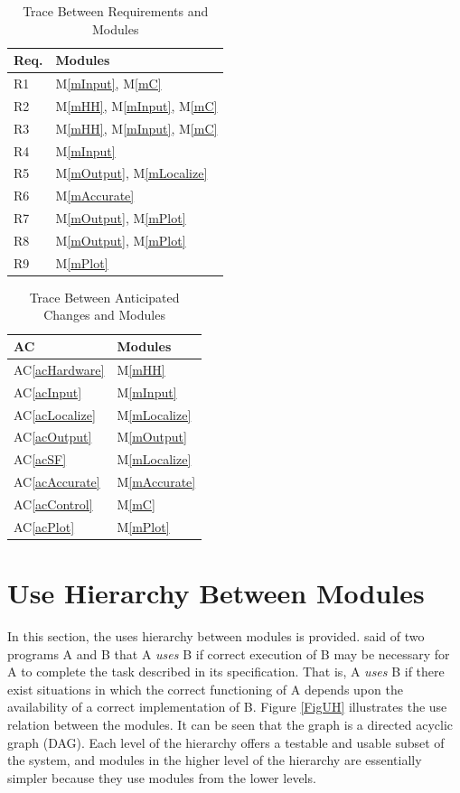 \documentclass[12pt, titlepage]{article}
\newcommand{\acref}[1]{AC\ref{#1}}
\newcommand{\mref}[1]{M\ref{#1}}
\begin{document}
\begin{table}[H]
\centering
\begin{tabular}{p{} p{}}
\toprule
\textbf{Req.} & \textbf{Modules}\\
\midrule
R1 & \mref{mInput}, \mref{mC}\\
R2 & \mref{mHH}, \mref{mInput}, \mref{mC}\\
R3 & \mref{mHH}, \mref{mInput}, \mref{mC}\\
R4 & \mref{mInput}\\
R5 & \mref{mOutput}, \mref{mLocalize}\\
R6 & \mref{mAccurate}\\
R7 & \mref{mOutput}, \mref{mPlot}\\
R8 & \mref{mOutput}, \mref{mPlot}\\
R9 & \mref{mPlot}\\
\bottomrule
\end{tabular}
\caption{Trace Between Requirements and Modules}
\label{TblRT}
\end{table}

\begin{table}[H]
\centering
\begin{tabular}{p{} p{}}
\toprule
\textbf{AC} & \textbf{Modules}\\
\midrule
\acref{acHardware} & \mref{mHH}\\
\acref{acInput} & \mref{mInput}\\
\acref{acLocalize} & \mref{mLocalize}\\
\acref{acOutput} & \mref{mOutput}\\
\acref{acSF} & \mref{mLocalize}\\
\acref{acAccurate} & \mref{mAccurate}\\
\acref{acControl} & \mref{mC}\\
\acref{acPlot} & \mref{mPlot}\\
\bottomrule
\end{tabular}
\caption{Trace Between Anticipated Changes and Modules}
\label{TblACT}
\end{table}

\section{Use Hierarchy Between Modules} \label{SecUse}

In this section, the uses hierarchy between modules is
provided. \citet{Parnas1978} said of two programs A and B that A {\em uses} B if
correct execution of B may be necessary for A to complete the task described in
its specification. That is, A {\em uses} B if there exist situations in which
the correct functioning of A depends upon the availability of a correct
implementation of B.  Figure \ref{FigUH} illustrates the use relation between
the modules. It can be seen that the graph is a directed acyclic graph
(DAG). Each level of the hierarchy offers a testable and usable subset of the
system, and modules in the higher level of the hierarchy are essentially simpler
because they use modules from the lower levels.
\end{document}
